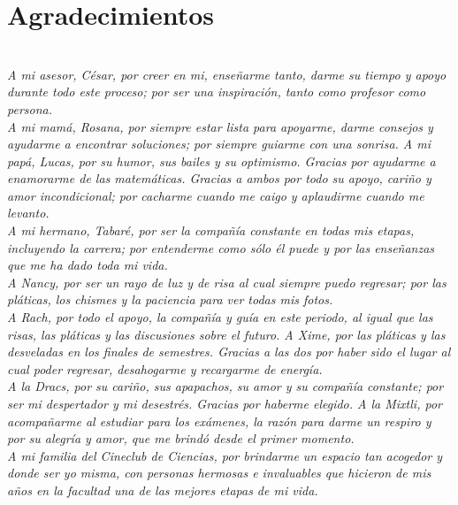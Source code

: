 \chapter*{Agradecimientos}

\textit{}\\

\textit{A mi asesor, C\'esar, por creer en mi, ense\~{n}arme tanto, darme su
tiempo y apoyo durante todo este proceso; por ser una inspiraci\'on, tanto como
profesor como persona.}\\

\textit{A mi mam\'a, Rosana, por siempre estar lista para apoyarme, darme
consejos y ayudarme a encontrar soluciones;  por siempre guiarme con una
sonrisa. A mi pap\'a, Lucas,  por su humor, sus bailes y su optimismo. Gracias
por ayudarme a enamorarme de las matem\'aticas. Gracias a ambos por todo su
apoyo, cari\~{n}o y amor incondicional; por cacharme cuando me caigo y
aplaudirme cuando me levanto.}\\

\textit{A mi hermano, Tabar\'e, por ser la compa\~{n}\'ia constante en todas mis
etapas, incluyendo la carrera; por entenderme como s\'olo \'el puede y por las
ense\~{n}anzas que me ha dado toda mi vida.}\\

\textit{A Nancy, por ser un rayo de luz y de risa al cual siempre puedo
regresar; por las pl\'aticas, los chismes y la paciencia para ver todas mis
fotos.}\\

\textit{A Rach, por todo el apoyo, la compa\~{n}\'ia y gu\'ia en este periodo, al
igual que las risas, las pl\'aticas y las discusiones sobre el futuro. A Xime,
por las pl\'aticas y las desveladas en los finales de semestres. Gracias a las
dos por haber sido el lugar al cual poder regresar, desahogarme y recargarme de
energ\'ia.} \\

\textit{A la Dracs, por su cari\~{n}o, sus apapachos, su amor y su compa\~{n}\'ia
constante; por ser mi despertador y mi desestr\'es. Gracias por haberme
elegido. A la Mixtli, por acompa\~{n}arme al estudiar para los ex\'amenes, la
raz\'on para darme un respiro y por su alegr\'ia y amor, que me brind\'o desde
el primer momento.}\\ 

\textit{A mi familia del Cineclub de Ciencias, por brindarme un espacio tan
acogedor  y donde ser yo misma, con personas hermosas e invaluables que hicieron
de mis a\~{n}os en la facultad una de las mejores etapas de mi vida.}\\

